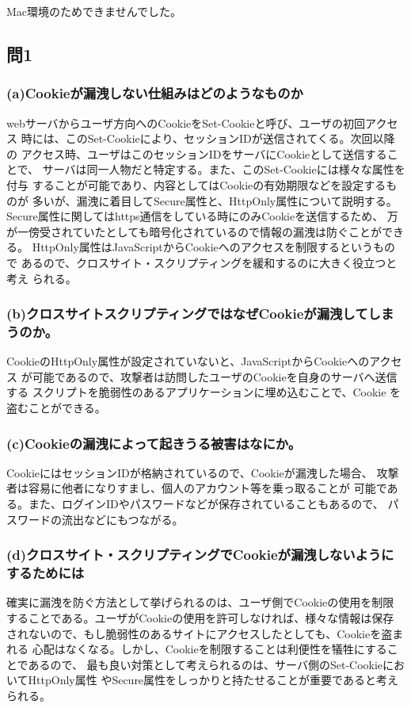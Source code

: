 \documentclass[dvipdfmx,autodetect-engine,titlepage]{jsarticle}
\begin{document}
Mac環境のためできませんでした。

\subsection{問1}

\subsubsection*{(a)Cookieが漏洩しない仕組みはどのようなものか}
webサーバからユーザ方向へのCookieをSet-Cookieと呼び、ユーザの初回アクセス
時には、このSet-Cookieにより、セッションIDが送信されてくる。次回以降の
アクセス時、ユーザはこのセッションIDをサーバにCookieとして送信することで、
サーバは同一人物だと特定する。また、このSet-Cookieには様々な属性を付与
することが可能であり、内容としてはCookieの有効期限などを設定するものが
多いが、漏洩に着目してSecure属性と、HttpOnly属性について説明する。
Secure属性に関してはhttps通信をしている時にのみCookieを送信するため、
万が一傍受されていたとしても暗号化されているので情報の漏洩は防ぐことができる。
HttpOnly属性はJavaScriptからCookieへのアクセスを制限するというもので
あるので、クロスサイト・スクリプティングを緩和するのに大きく役立つと考え
られる。

\subsubsection*{(b)クロスサイトスクリプティングではなぜCookieが漏洩してしまうのか。}
CookieのHttpOnly属性が設定されていないと、JavaScriptからCookieへのアクセス
が可能であるので、攻撃者は訪問したユーザのCookieを自身のサーバへ送信する
スクリプトを脆弱性のあるアプリケーションに埋め込むことで、Cookie
を盗むことができる。

\subsubsection*{(c)Cookieの漏洩によって起きうる被害はなにか。}
CookieにはセッションIDが格納されているので、Cookieが漏洩した場合、
攻撃者は容易に他者になりすまし、個人のアカウント等を乗っ取ることが
可能である。また、ログインIDやパスワードなどが保存されていることもあるので、
パスワードの流出などにもつながる。

\subsubsection*{(d)クロスサイト・スクリプティングでCookieが漏洩しないようにするためには}
確実に漏洩を防ぐ方法として挙げられるのは、ユーザ側でCookieの使用を制限
することである。ユーザがCookieの使用を許可しなければ、様々な情報は保存
されないので、もし脆弱性のあるサイトにアクセスしたとしても、Cookieを盗まれる
心配はなくなる。しかし、Cookieを制限することは利便性を犠牲にすることであるので、
最も良い対策として考えられるのは、サーバ側のSet-CookieにおいてHttpOnly属性
やSecure属性をしっかりと持たせることが重要であると考えられる。
\end{document}
